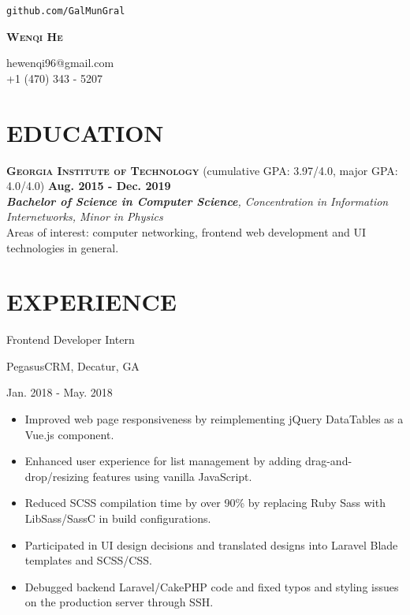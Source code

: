 \documentclass[11pt]{article}
\newcommand{\centertitle}[3]{
	{\noindent\bfseries
	\parbox[][0.5em][b]{0.35\textwidth}{#1\hfill}%
	\parbox[][0.5em][b]{0.3\textwidth}{\centerline{#2}}%
	\parbox[][0.5em][b]{0.35\textwidth}{\hfill#3}}
}
\begin{document}
\noindent
\parbox{0.25\textwidth}{\hfill\texttt{github.com/GalMunGral}}
\parbox{0.5\textwidth}{\centerline{\Huge\scshape\bfseries Wenqi He}}
\parbox{0.25\textwidth}{hewenqi96@gmail.com\\+1 (470) 343 - 5207}
%
\section*{EDUCATION}
{\large\scshape\bfseries Georgia Institute of Technology} \enspace (cumulative GPA: 3.97/4.0, major GPA: 4.0/4.0) \hfill {\bfseries Aug. 2015 - Dec. 2019}\\
{\itshape {\bfseries Bachelor of Science in Computer Science}, Concentration in Information Internetworks,  Minor in Physics}\\
\indent Areas of interest: {computer networking, frontend web development and UI technologies in general}.
\vspace{-0.5em}

\section*{EXPERIENCE}
\centertitle{Frontend Developer Intern}{PegasusCRM, Decatur, GA}{Jan. 2018 - May. 2018}
\begin{itemize}[leftmargin=15pt, noitemsep, topsep=0pt]
\item Improved web page responsiveness by reimplementing jQuery DataTables as a Vue.js component.
\item Enhanced user experience for list management by adding drag-and-drop/resizing features using vanilla JavaScript.
\item Reduced SCSS compilation time by over 90\% by replacing Ruby Sass with LibSass/SassC in build configurations.
\item Participated in UI design decisions and translated designs into Laravel Blade templates and SCSS/CSS.
\item Debugged backend Laravel/CakePHP code and fixed typos and styling issues on the production server through SSH.
\end{itemize}
\vspace{-0.5em}
\end{document}
